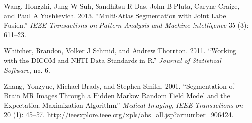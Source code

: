 \documentclass[]{elsarticle} %
\begin{document}
\leavevmode\hypertarget{ref-malf}{}%
Wang, Hongzhi, Jung W Suh, Sandhitsu R Das, John B Pluta, Caryne Craige, and Paul A Yushkevich. 2013. ``Multi-Atlas Segmentation with Joint Label Fusion.'' \emph{IEEE Transactions on Pattern Analysis and Machine Intelligence} 35 (3): 611--23.

\leavevmode\hypertarget{ref-orodicom}{}%
Whitcher, Brandon, Volker J Schmid, and Andrew Thornton. 2011. ``Working with the DICOM and NIfTI Data Standards in R.'' \emph{Journal of Statistical Software}, no. 6.

\leavevmode\hypertarget{ref-zhang_segmentation_2001}{}%
Zhang, Yongyue, Michael Brady, and Stephen Smith. 2001. ``Segmentation of Brain MR Images Through a Hidden Markov Random Field Model and the Expectation-Maximization Algorithm.'' \emph{Medical Imaging, IEEE Transactions on} 20 (1): 45--57. \url{http://ieeexplore.ieee.org/xpls/abs_all.jsp?arnumber=906424}.
\end{document}
